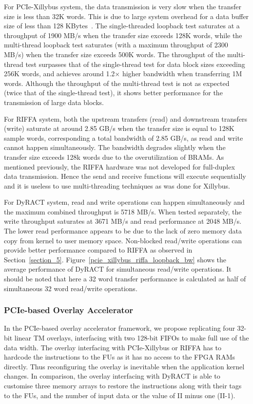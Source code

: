 For PCIe-Xillybus system, the data transmission is very slow when the transfer size is less than 32K words. 
This is due to large system overhead for a data buffer size of less than 128 KBytes~\cite{xillybus2018}. 
The single-threaded loopback test saturates at a throughput of 1900 MB/s when the transfer size exceeds 128K words, while the multi-thread loopback test saturates (with a maximum throughput of 2300 MB/s) when the transfer size exceeds 500K words. 
The throughput of the multi-thread test surpasses that of the single-thread test for data block sizes exceeding 256K words, and achieves around 1.2$\times$ higher bandwidth when transferring 1M words. 
Although the throughput of the multi-thread test is not as expected (twice that of the single-thread test), it shows better performance for the transmission of large data blocks. 


For RIFFA system, both the upstream transfers (read) and downstream transfers (write) saturate at around 2.85 GB/s when the transfer size is equal to 128K sample words, corresponding a total bandwidth of 2.85 GB/s, as read and write cannot happen simultaneously. 
The bandwidth degrades slightly when the transfer size exceeds 128k words due to the overutilization of BRAMs.
As mentioned previously, the RIFFA hardware was not developed for full-duplex data transmission. 
Hence the send and receive functions will execute sequentially and it is useless to use multi-threading techniques as was done for Xillybus. 

For DyRACT system, read and write operations can happen simultaneously and the maximum combined throughput is 5718 MB/s. When tested separately, the write throughput saturates at 3671 MB/s and read performance at 2048 MB/s.
The lower read performance appears to be due to the lack of zero memory data copy from kernel to user memory space.
Non-blocked read/write operations can provide better performance compared to RIFFA as observed in Section~\ref{section_5}.
Figure~\ref{pcie_xillybus_riffa_loopback_bw} shows the average performance of DyRACT for simultaneous read/write operations.
It should be noted that here a 32 word transfer performance is calculated as half of simultaneous 32 word read/write operations.

\subsubsection{PCIe-based Overlay Accelerator}
In the PCIe-based overlay accelerator framework, we propose replicating four 32-bit linear TM overlays, interfacing with two 128-bit FIFOs to make full use of the data width.
The overlay interfacing with PCIe-Xillybus or RIFFA has to hardcode the instructions to the FUs as it has no access to the FPGA RAMs directly. 
Thus reconfiguring the overlay is inevitable when the application kernel changes. 
In comparison, the overlay interfacing with DyRACT is able to customise three memory arrays to restore the instructions along with their tags to the FUs, and the number of input data or the value of II minus one (II-1). 


